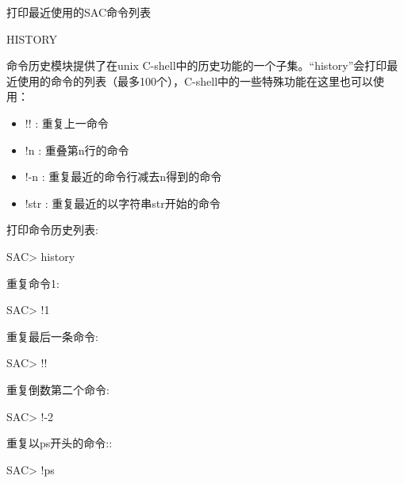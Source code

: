 \label{cmd:history}

打印最近使用的SAC命令列表

\begin{SACSTX}
HISTORY
\end{SACSTX}

命令历史模块提供了在unix C-shell中的历史功能的一个子集。``history''会打印最近使用的命令的列表（最多100个），C-shell中的一些特殊功能在这里也可以使用：
\begin{itemize}
\item !! : 重复上一命令
\item !n : 重叠第n行的命令
\item !-n : 重复最近的命令行减去n得到的命令
\item !str : 重复最近的以字符串str开始的命令
\end{itemize}

打印命令历史列表:
\begin{SACCode}
SAC> history
\end{SACCode}

重复命令1:
\begin{SACCode}
SAC> !1
\end{SACCode}

重复最后一条命令:
\begin{SACCode}
SAC> !!
\end{SACCode}

重复倒数第二个命令:
\begin{SACCode}
SAC> !-2
\end{SACCode}

重复以ps开头的命令::
\begin{SACCode}
SAC> !ps
\end{SACCode}
